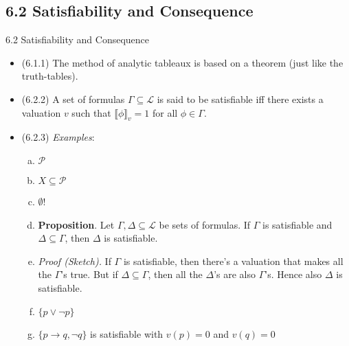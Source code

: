 \documentclass[../slides.tex]{subfiles}
\begin{document}
\subsection{6.2 Satisfiability and Consequence}

\begin{frame}{6.2 Satisfiability and Consequence}

	\begin{itemize}
	
		\item (6.1.1) The method of analytic tableaux is based on a theorem (just like the truth-tables).
	
		\item	(6.2.2)  A set of formulas $\Gamma\subseteq\mathcal{L}$ is said to be satisfiable iff there exists a valuation $v$ such that $\llbracket\phi\rrbracket_v=1$ for all $\phi\in\Gamma$.
		
		\item (6.2.3) \emph{Examples}:
		
			\begin{enumerate}[(a)]
			
				\item $\mathcal{P}$
				
				\item $X\subseteq\mathcal{P}$
				
				\item$\emptyset$!
				
				\item \textbf{Proposition}. Let $\Gamma,\Delta\subseteq\mathcal{L}$ be sets of formulas. If $\Gamma$ is satisfiable and $\Delta\subseteq \Gamma$, then $\Delta$ is satisfiable.				
				\item[] \emph{Proof (Sketch).} If $\Gamma$ is satisfiable, then there's a valuation that makes all the $\Gamma$'s true. But if $\Delta\subseteq\Gamma$, then all the $\Delta$'s are also $\Gamma$'s. Hence also $\Delta$ is satisfiable.
			
				\item $\{p\lor\neg p\}$
			
				\item $\{p\to q, \neg q\}$ is satisfiable with $v(p)=0$ and $v(q)=0$
			
			\end{enumerate}
	
	\end{itemize}

\end{frame}
\end{document}
